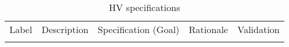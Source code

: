 \begin{footnotesize}
\begin{longtable}{p{}p{}p{}p{}p{}}
\caption{HV specifications } \\
  \rowcolor{dunesky}
       Label & Description  & Specification \newline (Goal) & Rationale & Validation \\  \colhline













\label{tab:specs:SP-HV}
\end{longtable}
\end{footnotesize}